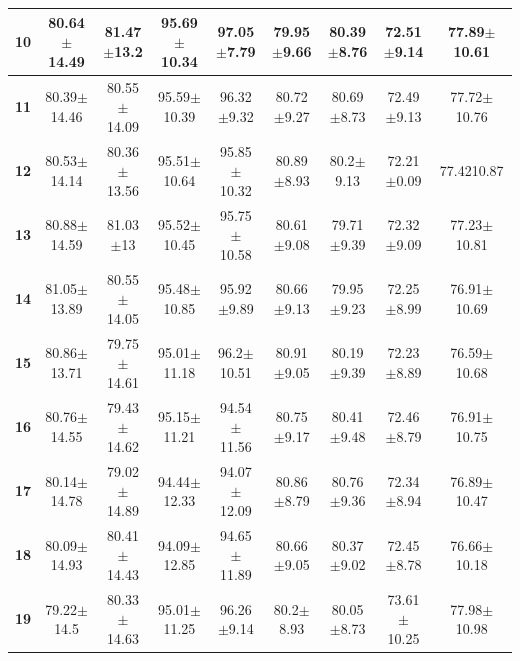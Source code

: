 \begin{table}[h!]
{\begin{tabular}{|*{9}{c|}}
		\textbf{10}    & 80.64$ \pm $14.49 & 81.47$ \pm $13.2 & 95.69$ \pm $10.34 & 97.05$ \pm $7.79 & 79.95$ \pm $9.66 & 80.39$ \pm $8.76 & 72.51$ \pm $9.14 & 77.89$ \pm $10.61 \\\hline
		\textbf{11}    & 80.39$ \pm $14.46 & 80.55$ \pm $14.09 & 95.59$ \pm $10.39 & 96.32$ \pm $9.32 & 80.72$ \pm $9.27 & 80.69$ \pm $8.73 & 72.49$ \pm $9.13 & 77.72$ \pm $10.76 \\\hline
		\textbf{12}    & 80.53$ \pm $14.14 & 80.36$ \pm $13.56 & 95.51$ \pm $10.64 & 95.85$ \pm $10.32 & 80.89$ \pm $8.93 & 80.2$ \pm $9.13 & 72.21$ \pm $0.09 & 77.4210.87 \\\hline
		\textbf{13}    & 80.88$ \pm $14.59 & 81.03$ \pm $13 & 95.52$ \pm $10.45 & 95.75$ \pm $10.58 & 80.61$ \pm $9.08 & 79.71$ \pm $9.39 & 72.32$ \pm $9.09 & 77.23$ \pm $10.81 \\\hline
		\textbf{14}    & 81.05$ \pm $13.89 & 80.55$ \pm $14.05 & 95.48$ \pm $10.85 & 95.92$ \pm $9.89 & 80.66$ \pm $9.13 & 79.95$ \pm $9.23 & 72.25$ \pm $8.99 & 76.91$ \pm $10.69 \\\hline
		\textbf{15}    & 80.86$ \pm $13.71 & 79.75$ \pm $14.61 & 95.01$ \pm $11.18 & 96.2$ \pm $10.51 & 80.91$ \pm $9.05 & 80.19$ \pm $9.39 & 72.23$ \pm $8.89 & 76.59$ \pm $10.68 \\\hline
		\textbf{16}    & 80.76$ \pm $14.55 & 79.43$ \pm $14.62 & 95.15$ \pm $11.21 & 94.54$ \pm $11.56 & 80.75$ \pm $9.17 & 80.41$ \pm $9.48 & 72.46$ \pm $8.79 & 76.91$ \pm $10.75 \\\hline
		\textbf{17}    & 80.14$ \pm $14.78 & 79.02$ \pm $14.89 & 94.44$ \pm $12.33 & 94.07$ \pm $12.09 & 80.86$ \pm $8.79 & 80.76$ \pm $9.36 & 72.34$ \pm $8.94 & 76.89$ \pm $10.47 \\\hline
		\textbf{18}    & 80.09$ \pm $14.93 & 80.41$ \pm $14.43 & 94.09$ \pm $12.85 & 94.65$ \pm $11.89 & 80.66$ \pm $9.05 & 80.37$ \pm $9.02 & 72.45$ \pm $8.78 & 76.66$ \pm $10.18 \\\hline
		\textbf{19}    & 79.22$ \pm $14.5 & 80.33$ \pm $14.63 & 95.01$ \pm $11.25 & 96.26$ \pm $9.14 & 80.2$ \pm $8.93 & 80.05$ \pm $8.73 & 73.61$ \pm $10.25 & 77.98$ \pm $10.98 \\\hline
	\end{tabular}%
	}
	\label{Table: CV_21feats}%
\end{table}%

